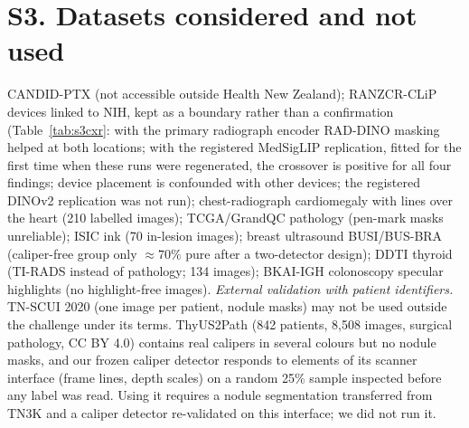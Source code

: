 \documentclass[review,3p]{elsarticle}
\begin{document}
\section*{S3. Datasets considered and not used}\label{supp:S3}
CANDID-PTX (not accessible outside Health New Zealand); RANZCR-CLiP devices linked to NIH, kept as a boundary rather than a
confirmation (Table~\ref{tab:s3cxr}: with the primary radiograph encoder RAD-DINO masking helped at both locations; with
the registered MedSigLIP replication, fitted for the first time when these runs were regenerated, the crossover is
positive for all four findings; device placement is confounded with other devices; the registered DINOv2 replication
was not run); chest-radiograph cardiomegaly with lines over the heart
(210 labelled images); TCGA/GrandQC pathology (pen-mark masks unreliable); ISIC ink (70 in-lesion images);
breast ultrasound BUSI/BUS-BRA (caliper-free group only $\approx70\%$ pure after a two-detector design); DDTI
thyroid (TI-RADS instead of pathology; 134 images); BKAI-IGH colonoscopy specular highlights (no highlight-free
images). \emph{External validation with patient identifiers.} TN-SCUI 2020 (one image per patient, nodule masks)
may not be used outside the challenge under its terms. ThyUS2Path \citep{hou2024thyus2path} (842 patients, 8,508
images, surgical pathology, CC BY 4.0) contains real calipers in several colours but no nodule masks, and our frozen
caliper detector responds to elements of its scanner interface (frame lines, depth scales) on a random 25\% sample
inspected before any label was read. Using it requires a nodule segmentation transferred from TN3K and a caliper
detector re-validated on this interface; we did not run it.



\end{document}
